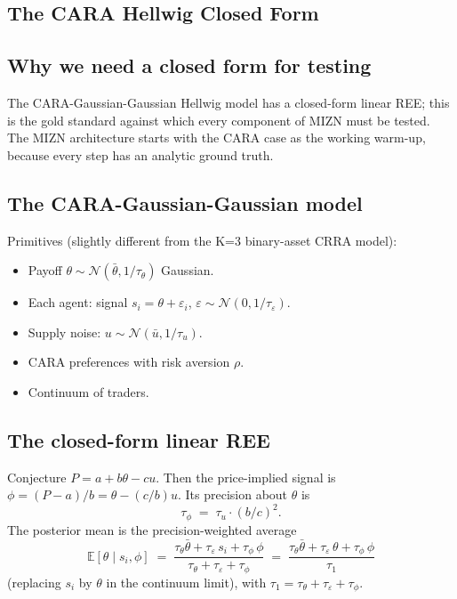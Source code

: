 \documentclass[11pt,oneside]{book}
\theoremstyle{definition}
\begin{document}
\begin{tcolorbox}[title=\textbf{CRRA market-clearing bisection (matches \texttt{crra\_clear\_nb} in MIZN)},
                    colback=gray!5, colframe=black]
\chapter{The CARA Hellwig Closed Form}
\label{ch:hellwig_form}

\section{Why we need a closed form for testing}

The CARA-Gaussian-Gaussian Hellwig model has a closed-form linear REE; this
is the gold standard against which every component of MIZN must be tested.
The MIZN architecture starts with the CARA case as the working warm-up,
because every step has an analytic ground truth.

\section{The CARA-Gaussian-Gaussian model}

Primitives (slightly different from the K=3 binary-asset CRRA model):
\begin{itemize}
\item Payoff $\theta \sim \mathcal{N}(\bar\theta, 1/\tau_\theta)$ Gaussian.
\item Each agent: signal $s_i = \theta + \varepsilon_i$, $\varepsilon \sim
\mathcal{N}(0, 1/\tau_\varepsilon)$.
\item Supply noise: $u \sim \mathcal{N}(\bar u, 1/\tau_u)$.
\item CARA preferences with risk aversion $\rho$.
\item Continuum of traders.
\end{itemize}

\section{The closed-form linear REE}

Conjecture $P = a + b\theta - cu$. Then the price-implied signal is
$\phi = (P-a)/b = \theta - (c/b)u$. Its precision about $\theta$ is
\begin{equation}
\tau_\phi \;=\; \tau_u \cdot (b/c)^2.
\label{eq:taupi}
\end{equation}
The posterior mean is the precision-weighted average
\begin{equation}
\mathbb{E}[\theta \mid s_i, \phi] \;=\;
\frac{\tau_\theta \bar\theta + \tau_\varepsilon\,s_i + \tau_\phi\,\phi}
{\tau_\theta + \tau_\varepsilon + \tau_\phi}
\;=\; \frac{\tau_\theta \bar\theta + \tau_\varepsilon\,\theta + \tau_\phi\,\phi}{\tau_1}
\label{eq:Ebar}
\end{equation}
(replacing $s_i$ by $\theta$ in the continuum limit), with
$\tau_1 = \tau_\theta + \tau_\varepsilon + \tau_\phi$.


\end{tcolorbox}
\end{document}
